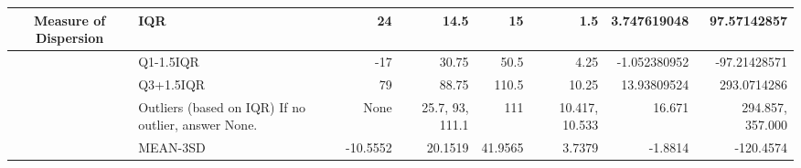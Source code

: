 \begin{table}[ht]
\begin{adjustbox}{width = \textwidth, center}
\begin{tabular}{|cl|r|r|r|r|r|r|}
        \multicolumn{1}{|c|}{\multirow{-10}{*}{Measure of Dispersion}} & \cellcolor[HTML]{CFE2F3}IQR                                                  & 24                                               & 14.5                                                     & 15                                                      & 1.5                                                              & 3.747619048                                                                  & 97.57142857                                                                      \\ \hline
        \multicolumn{1}{|c|}{}                                         & Q1-1.5IQR                                                                    & -17                                              & 30.75                                                    & 50.5                                                    & 4.25                                                             & -1.052380952                                                                 & -97.21428571                                                                     \\ \cline{2-8} 
        \multicolumn{1}{|c|}{}                                         & Q3+1.5IQR                                                                    & 79                                               & 88.75                                                    & 110.5                                                   & 10.25                                                            & 13.93809524                                                                  & 293.0714286                                                                      \\ \cline{2-8} 
        \multicolumn{1}{|c|}{}                                         & \cellcolor[HTML]{D9D2E9}Outliers (based on IQR)  If no outlier, answer None. & None                                             & 25.7, 93, 111.1                                          & 111                                                     & 10.417, 10.533                                                   & 16.671                                                                       & 294.857, 357.000                                                                 \\ \cline{2-8} 
        \multicolumn{1}{|c|}{}                                         & MEAN-3SD                                                                     & -10.5552                                         & 20.1519                                                  & 41.9565                                                 & 3.7379                                                           & -1.8814                                                                      & -120.4574                                                                        \\ \cline{2-8} 

\end{tabular}
\end{adjustbox}
\end{table}
